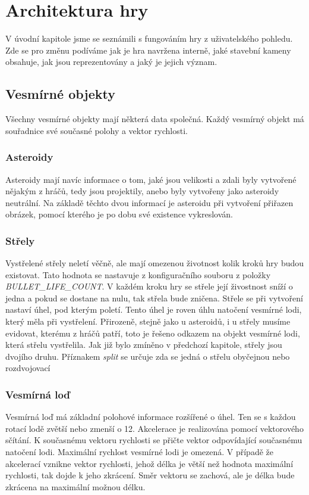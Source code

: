 \chapter{Architektura hry}
V úvodní kapitole jsme se seznámili s fungováním hry z uživatelského pohledu. 
Zde se pro změnu podíváme jak je hra navržena interně, jaké stavební kameny obsahuje, jak jsou reprezentovány a jaký je jejich význam.

\section{Vesmírné objekty}
Všechny vesmírné objekty mají některá data společná. Každý vesmírný objekt má souřadnice své současné polohy a vektor rychlosti.

\subsection{Asteroidy}
Asteroidy mají navíc informace o tom, jaké jsou velikosti a zdali byly vytvořené nějakým z hráčů, tedy jsou projektily, anebo byly vytvořeny jako asteroidy neutrální.
Na základě těchto dvou informací je asteroidu při vytvoření přiřazen obrázek, pomocí kterého je po dobu své existence vykreslován.

\subsection{Střely}
Vystřelené střely neletí věčně, ale mají omezenou životnost kolik kroků hry budou existovat.
Tato hodnota se nastavuje z konfiguračního souboru z položky \emph{\uppercase{bullet\_life\_count}}.
V každém kroku hry se střele její živostnost sníží o jedna a pokud se dostane na nulu, tak střela bude zničena.
Střele se při vytvoření nastaví úhel, pod kterým poletí. Tento úhel je roven úhlu natočení vesmírné lodi, který měla při vystřelení.
Přirozeně, stejně jako u asteroidů, i u střely musíme evidovat, kterému z hráčů patří, toto je řešeno odkazem na objekt vesmírné lodi, která střelu vystřelila.
Jak již bylo zmíněno v předchozí kapitole, střely jsou dvojího druhu. Příznakem \emph{split} se určuje zda se jedná o střelu obyčejnou nebo rozdvojovací


\subsection{Vesmírná loď}
Vesmírná loď má základní polohové informace rozšířené o úhel. Ten se s každou rotací lodě zvětší nebo zmenší o 12\textdegree.
Akcelerace je realizována pomocí vektorového sčítání. K současnému vektoru rychlosti se přičte vektor odpovídající současnému natočení lodi.
Maximální rychlost vesmírné lodi je omezená.
V případě že akcelerací vznikne vektor rychlosti, jehož délka je větší než hodnota maximální rychlosti, tak dojde k jeho zkrácení.
Směr vektoru se zachová, ale je délka bude zkrácena na maximální možnou délku.

